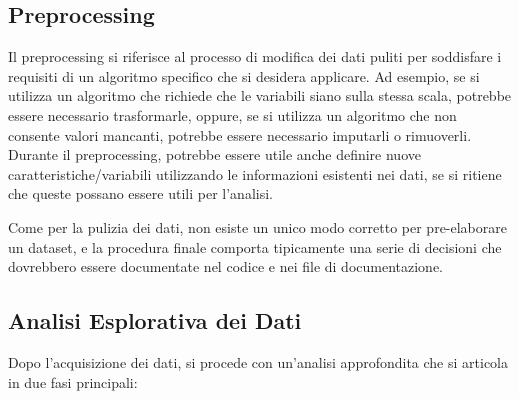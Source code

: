 \documentclass[
  letterpaper,
  DIV=11,
  numbers=noendperiod]{scrreprt}
\theoremstyle{definition}
\theoremstyle{remark}
\begin{document}
\subsection{Preprocessing}\label{preprocessing}

Il preprocessing si riferisce al processo di modifica dei dati puliti
per soddisfare i requisiti di un algoritmo specifico che si desidera
applicare. Ad esempio, se si utilizza un algoritmo che richiede che le
variabili siano sulla stessa scala, potrebbe essere necessario
trasformarle, oppure, se si utilizza un algoritmo che non consente
valori mancanti, potrebbe essere necessario imputarli o rimuoverli.
Durante il preprocessing, potrebbe essere utile anche definire nuove
caratteristiche/variabili utilizzando le informazioni esistenti nei
dati, se si ritiene che queste possano essere utili per l'analisi.

Come per la pulizia dei dati, non esiste un unico modo corretto per
pre-elaborare un dataset, e la procedura finale comporta tipicamente una
serie di decisioni che dovrebbero essere documentate nel codice e nei
file di documentazione.

\subsection{Analisi Esplorativa dei
Dati}\label{analisi-esplorativa-dei-dati}

Dopo l'acquisizione dei dati, si procede con un'analisi approfondita che
si articola in due fasi principali:
\end{document}
